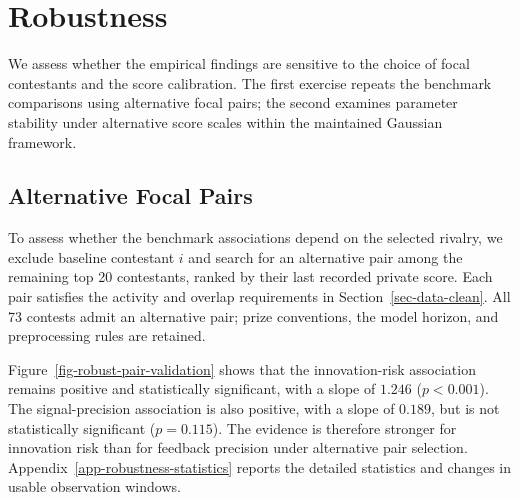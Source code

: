 \documentclass[mnsc]{informs3}
\begin{document}
\section{Robustness}

{We assess whether the empirical findings are sensitive to the choice of focal contestants and the score calibration. The first exercise repeats the benchmark comparisons using alternative focal pairs; the second examines parameter stability under alternative score scales within the maintained Gaussian framework.}

\subsection{Alternative Focal Pairs}\label{sect-robust-2players}

{To assess whether the benchmark associations depend on the selected rivalry, we exclude baseline contestant $i$ and search for an alternative pair among the remaining top 20 contestants, ranked by their last recorded private score. Each pair satisfies the activity and overlap requirements in Section~\ref{sec-data-clean}. All 73 contests admit an alternative pair; prize conventions, the model horizon, and preprocessing rules are retained.}

Figure~\ref{fig-robust-pair-validation} shows that the innovation-risk association remains positive and statistically significant, with a slope of $1.246$ ($p<0.001$). The signal-precision association is also positive, with a slope of $0.189$, but is not statistically significant ($p=0.115$). The evidence is therefore stronger for innovation risk than for feedback precision under alternative pair selection. Appendix~\ref{app-robustness-statistics} reports the detailed statistics and changes in usable observation windows.
\end{document}

